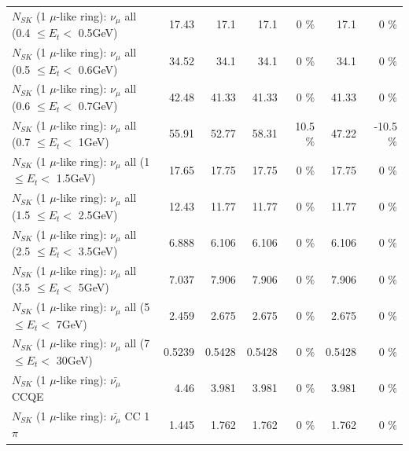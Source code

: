 \begin{table}
\begin{tabular}{| l | r | r | r  r | r  r |}
       $N_{SK}$ (1 $\mu$-like ring): $\nu_{\mu}$ all (0.4 $\leq E_{t} <$ 0.5GeV) &           17.43 &            17.1 &            17.1 &        0 \%  &            17.1 &        0 \%  \\ 
       $N_{SK}$ (1 $\mu$-like ring): $\nu_{\mu}$ all (0.5 $\leq E_{t} <$ 0.6GeV) &           34.52 &            34.1 &            34.1 &        0 \%  &            34.1 &        0 \%  \\ 
       $N_{SK}$ (1 $\mu$-like ring): $\nu_{\mu}$ all (0.6 $\leq E_{t} <$ 0.7GeV) &           42.48 &           41.33 &           41.33 &        0 \%  &           41.33 &        0 \%  \\ 
         $N_{SK}$ (1 $\mu$-like ring): $\nu_{\mu}$ all (0.7 $\leq E_{t} <$ 1GeV) &           55.91 &           52.77 &           58.31 &     10.5 \%  &           47.22 &    -10.5 \%  \\ 
         $N_{SK}$ (1 $\mu$-like ring): $\nu_{\mu}$ all (1 $\leq E_{t} <$ 1.5GeV) &           17.65 &           17.75 &           17.75 &        0 \%  &           17.75 &        0 \%  \\ 
       $N_{SK}$ (1 $\mu$-like ring): $\nu_{\mu}$ all (1.5 $\leq E_{t} <$ 2.5GeV) &           12.43 &           11.77 &           11.77 &        0 \%  &           11.77 &        0 \%  \\ 
       $N_{SK}$ (1 $\mu$-like ring): $\nu_{\mu}$ all (2.5 $\leq E_{t} <$ 3.5GeV) &           6.888 &           6.106 &           6.106 &        0 \%  &           6.106 &        0 \%  \\ 
         $N_{SK}$ (1 $\mu$-like ring): $\nu_{\mu}$ all (3.5 $\leq E_{t} <$ 5GeV) &           7.037 &           7.906 &           7.906 &        0 \%  &           7.906 &        0 \%  \\ 
           $N_{SK}$ (1 $\mu$-like ring): $\nu_{\mu}$ all (5 $\leq E_{t} <$ 7GeV) &           2.459 &           2.675 &           2.675 &        0 \%  &           2.675 &        0 \%  \\ 
          $N_{SK}$ (1 $\mu$-like ring): $\nu_{\mu}$ all (7 $\leq E_{t} <$ 30GeV) &          0.5239 &          0.5428 &          0.5428 &        0 \%  &          0.5428 &        0 \%  \\ 
\hline
\hline
\hline
                              $N_{SK}$ (1 $\mu$-like ring): $\bar{\nu_\mu}$ CCQE &            4.46 &           3.981 &           3.981 &        0 \%  &           3.981 &        0 \%  \\ 
                         $N_{SK}$ (1 $\mu$-like ring): $\bar{\nu_\mu}$ CC 1$\pi$ &           1.445 &           1.762 &           1.762 &        0 \%  &           1.762 &        0 \%  \\ 

\end{tabular}
\end{table}
